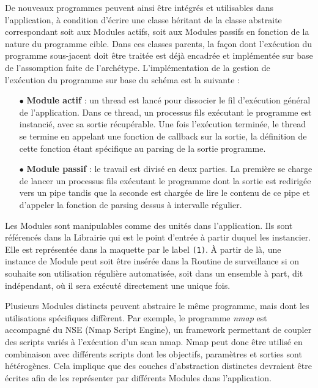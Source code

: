 \documentclass[]{article}
\begin{document}
\par De nouveaux programmes peuvent ainsi être intégrés et utilisables dans l'application, à condition d'écrire une classe héritant de la classe abstraite correspondant soit aux Modules actifs, soit aux Modules passifs en fonction de la nature du programme cible. Dans ces classes parents, la façon dont l'exécution du programme sous-jacent doit être traitée est déjà encadrée et implémentée sur base de l'assomption faite de l'archétype. L'implémentation de la gestion de l'exécution du programme sur base du schéma est la suivante :
\vspace{0.2cm}
\begin{itemize}
\item[$\bullet$] \textbf{Module actif} : un thread est lancé pour dissocier le fil d'exécution général de l'application. Dans ce thread, un processus fils exécutant le programme est instancié, avec sa sortie récupérable. Une fois l'exécution terminée, le thread se termine en appelant une fonction de callback sur la sortie, la définition de cette fonction étant spécifique au parsing de la sortie programme.
\vspace{0.2cm}
\item[$\bullet$] \textbf{Module passif} : le travail est divisé en deux parties. La première se charge de lancer un processus fils exécutant le programme dont la sortie est redirigée vers un pipe tandis que la seconde est chargée de lire le contenu de ce pipe et d'appeler la fonction de parsing dessus à intervalle régulier.
\end{itemize}
\vspace{0.4cm}

\par Les Modules sont manipulables comme des unités dans l'application. Ils sont référencés dans la Librairie qui est le point d'entrée à partir duquel les instancier. Elle est représentée dans la maquette par le label \texttt{(1)}. À partir de là, une instance de Module peut soit être insérée dans la Routine de surveillance si on souhaite son utilisation régulière automatisée, soit dans un ensemble à part, dit indépendant, où il sera exécuté directement une unique fois.\\

\par Plusieurs Modules distincts peuvent abstraire le même programme, mais dont les utilisations spécifiques diffèrent. Par exemple, le programme \textit{nmap} est accompagné du NSE (Nmap Script Engine), un framework permettant de coupler des scripts variés à l'exécution d'un scan nmap. Nmap peut donc être utilisé en combinaison avec différents scripts dont les objectifs, paramètres et sorties sont  hétérogènes. Cela implique que des couches d'abstraction distinctes devraient être écrites afin de les représenter par différents Modules dans l'application.\\
\end{document}
